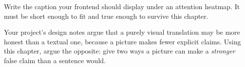 \begin{exercises}
 Write the caption your frontend should display under
an attention heatmap. It must be short enough to fit and true enough to survive this chapter.

 Your project's design notes argue that a purely
visual translation may be more honest than a textual one, because a picture makes fewer
explicit claims. Using this chapter, argue the opposite: give two ways a picture can make a
\emph{stronger} false claim than a sentence would.

\end{exercises}
